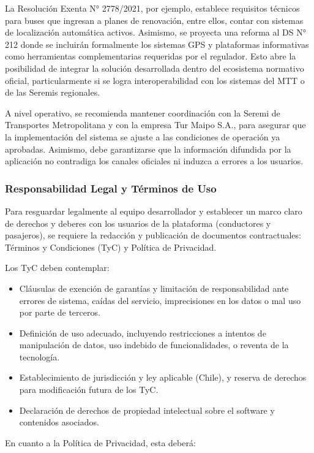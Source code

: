 \documentclass[12pt]{article}
\begin{document}
La Resolución Exenta N° 2778/2021, por ejemplo, establece requisitos técnicos para buses que ingresan a planes de renovación, entre ellos, contar con sistemas de localización automática activos. Asimismo, se proyecta una reforma al DS N° 212 donde se incluirán formalmente los sistemas GPS y plataformas informativas como herramientas complementarias requeridas por el regulador. Esto abre la posibilidad de integrar la solución desarrollada dentro del ecosistema normativo oficial, particularmente si se logra interoperabilidad con los sistemas del MTT o de las Seremis regionales.

A nivel operativo, se recomienda mantener coordinación con la Seremi de Transportes Metropolitana y con la empresa Tur Maipo S.A., para asegurar que la implementación del sistema se ajuste a las condiciones de operación ya aprobadas. Asimismo, debe garantizarse que la información difundida por la aplicación no contradiga los canales oficiales ni induzca a errores a los usuarios.\\

\subsubsection{Responsabilidad Legal y Términos de Uso}

Para resguardar legalmente al equipo desarrollador y establecer un marco claro de derechos y deberes con los usuarios de la plataforma (conductores y pasajeros), se requiere la redacción y publicación de documentos contractuales: Términos y Condiciones (TyC) y Política de Privacidad.

Los TyC deben contemplar:

\begin{itemize}
    \item Cláusulas de exención de garantías y limitación de responsabilidad ante errores de sistema, caídas del servicio, imprecisiones en los datos o mal uso por parte de terceros.
    \item Definición de uso adecuado, incluyendo restricciones a intentos de manipulación de datos, uso indebido de funcionalidades, o reventa de la tecnología.
    \item Establecimiento de jurisdicción y ley aplicable (Chile), y reserva de derechos para modificación futura de los TyC.
    \item Declaración de derechos de propiedad intelectual sobre el software y contenidos asociados.
\end{itemize}
En cuanto a la Política de Privacidad, esta deberá:
\end{document}
